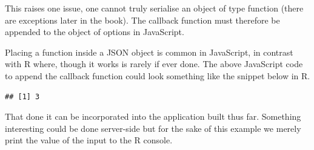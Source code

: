 \documentclass[
]{krantz}
\makeatletter
\newenvironment{Shaded}{\begin{snugshade}}{\end{snugshade}}
\newcommand{\ControlFlowTok}[1]{\textcolor[rgb]{0.27,0.27,0.27}{\textbf{#1}}}
\newcommand{\DataTypeTok}[1]{\textcolor[rgb]{0.27,0.27,0.27}{#1}}
\newcommand{\DecValTok}[1]{\textcolor[rgb]{0.06,0.06,0.06}{#1}}
\newcommand{\KeywordTok}[1]{\textcolor[rgb]{0.27,0.27,0.27}{\textbf{#1}}}
\newcommand{\NormalTok}[1]{#1}
\newcommand{\OperatorTok}[1]{\textcolor[rgb]{0.43,0.43,0.43}{\textbf{#1}}}
\newcommand{\StringTok}[1]{\textcolor[rgb]{0.5,0.5,0.5}{#1}}
\newenvironment{kframe}{%
\medskip{}
\setlength{\fboxsep}{.8em}
 \def\at@end@of@kframe{}%
 \ifinner\ifhmode%
  \def\at@end@of@kframe{\end{minipage}}%
  \begin{minipage}{\columnwidth}%
 \fi\fi%
 \def\FrameCommand##1{\hskip\@totalleftmargin \hskip-\fboxsep
 \colorbox{shadecolor}{##1}\hskip-\fboxsep
     \hskip-\linewidth \hskip-\@totalleftmargin \hskip\columnwidth}%
 \MakeFramed {\advance\hsize-\width
   \@totalleftmargin\z@ \linewidth\hsize
   \@setminipage}}%
 {\par\unskip\endMakeFramed%
 \at@end@of@kframe}
\renewenvironment{Shaded}{\begin{kframe}}{\end{kframe}}
\makeatother
\begin{document}
This raises one issue, one cannot truly serialise an object of type function (there are exceptions later in the book). The callback function must therefore be appended to the object of options in JavaScript.

\begin{Shaded}
\end{Shaded}

Placing a function inside a JSON object is common in JavaScript, in contrast with R where, though it works is rarely if ever done. The above JavaScript code to append the callback function could look something like the snippet below in R.

\begin{Shaded}
\end{Shaded}

\begin{verbatim}
## [1] 3
\end{verbatim}

That done it can be incorporated into the application built thus far. Something interesting could be done server-side but for the sake of this example we merely print the value of the input to the R console.
\end{document}
